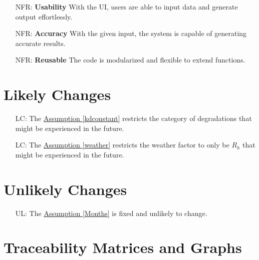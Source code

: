 \documentclass[12pt]{article}
\newcounter{nfrnum} %
\newcounter{lcnum} %
\begin{document}
\noindent \begin{itemize}

\item[NFR\refstepcounter{nfrnum}\thenfrnum \label{NFR_Usability}:]
  \textbf{Usability} With the UI, users are able to input data and generate output effortlessly.

\item[NFR\refstepcounter{nfrnum}\thenfrnum \label{NFR_Accuracy}:]
  \textbf{Accuracy} With the given input, the system is capable of generating accurate results.

\item[NFR\refstepcounter{nfrnum}\thenfrnum \label{NFR_Reusable}:] \textbf{Reusable} The code is modularized and flexible to extend functions.
\end{itemize}

\section{Likely Changes}    

\noindent 
\begin{itemize}

\item[LC\refstepcounter{lcnum}\thelcnum\label{LC_meaningfulLabel}:] The \hyperref[kdconstant]{Assumption \ref*{kdconstant}} restricts the category of degradations that might be experienced in the future.

\item[LC\refstepcounter{lcnum}\thelcnum\label{LC_meaningfulLabe2}:] The \hyperref[weather]{Assumption \ref*{weather}} restricts the weather factor to only be \(R_h\) that might be experienced in the future.
\end{itemize}
\section{Unlikely Changes}    

\noindent \begin{itemize}

\item[UL\refstepcounter{lcnum}\thelcnum\label{UL_meaningfulLabel}:] The \hyperref[Months]{Assumption \ref*{Months}} is fixed and unlikely to change.

\end{itemize}

\section{Traceability Matrices and Graphs}
\end{document}
